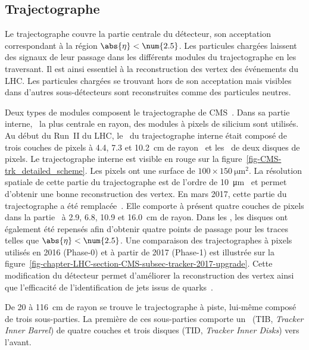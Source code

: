 \subsection{Trajectographe}\label{chapter-LHC-section-CMS-subsec-tracker}
Le trajectographe couvre la partie centrale du détecteur, son acceptation correspondant à la région $\abs{\eta} < \num{2.5}$.
Les particules chargées laissent des signaux de leur passage dans les différents modules du trajectographe en les traversant.
Il est ainsi essentiel à la reconstruction des vertex des événements du LHC.
Les particules chargées se trouvant hors de son acceptation mais visibles dans d'autres sous-détecteurs sont reconstruites comme des particules neutres.
\par Deux types de modules composent le trajectographe de CMS~\cite{cms_paper,CERN-LHCC-98-006,CMS-TDR-11,CMS-TRK-11-001,CMS-TRK-17-001}.
Dans sa partie interne, \ie\ la plus centrale en rayon, des modules à pixels de silicium sont utilisés.
Au début du Run~II du LHC, le \CMSbarrel\ du trajectographe interne était composé de trois couches de pixels à \num{4.4}, \num{7.3} et \SI{10.2}{\centi\meter} de rayon~\cite{cms_paper} et les \CMSendcaps\ de deux disques de pixels.
Le trajectographe interne est visible en rouge sur la figure~\ref{fig-CMS-trk_detailed_scheme}.
Les pixels ont une surface de $\num{100}\times\SI{150}{\micro\meter^2}$.
La résolution spatiale de cette partie du trajectographe est de l'ordre de \SI{10}{\micro\meter}~\cite{cms_paper} et permet d'obtenir une bonne reconstruction des vertex.
En mars 2017, cette partie du trajectographe a été remplacée~\cite{CMS-TDR-11,cms_trk_upgrade_2017}.
Elle comporte à présent quatre couches de pixels dans la partie \CMSbarrel\ à \num{2.9}, \num{6.8}, \num{10.9} et \SI{16.0}{\centi\meter} de rayon.
Dans les \CMSendcaps, les disques ont également été repensés afin d'obtenir quatre points de passage pour les traces telles que $\abs{\eta}<\num{2.5}$.
Une comparaison des trajectographes à pixels utilisés en 2016 (Phase-0) et à partir de 2017 (Phase-1) est illustrée sur la figure~\ref{fig-chapter-LHC-section-CMS-subsec-tracker-2017-upgrade}.
Cette modification du détecteur permet d'améliorer la reconstruction des vertex ainsi que l'efficacité de l'identification de jets issus de quarks~\quarkb.
\par
De \num{20} à \SI{116}{\centi\meter} de rayon se trouve le trajectographe à piste, lui-même composé de trois sous-parties.
La première de ces sous-parties comporte un \CMSbarrel\ (TIB, \emph{Tracker Inner Barrel}) de quatre couches et trois disques (TID, \emph{Tracker Inner Disks}) vers l'avant.
